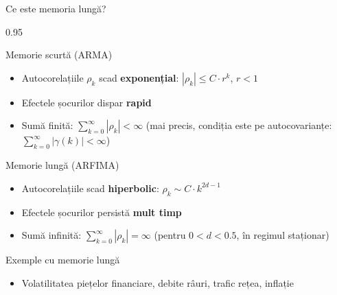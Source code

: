 \documentclass[9pt, aspectratio=169, t]{beamer}
\begin{document}
\begin{frame}{Ce este memoria lungă?}
    \begin{cminipage}{0.95\textwidth}
        \begin{block}{Memorie scurtă (ARMA)}
            \begin{itemize}\setlength{\itemsep}{0pt}
                \item Autocorelațiile $\rho_k$ scad \textbf{exponențial}: $|\rho_k| \leq C \cdot r^k$, $r < 1$
                \item Efectele șocurilor dispar \textbf{rapid}
                \item Sumă finită: $\sum_{k=0}^{\infty} |\rho_k| < \infty$ (mai precis, condiția este pe autocovarianțe: $\sum_{k=0}^{\infty} |\gamma(k)| < \infty$)
            \end{itemize}
        \end{block}

        \vspace{0.1cm}

        \begin{alertblock}{Memorie lungă (ARFIMA)}
            \begin{itemize}\setlength{\itemsep}{0pt}
                \item Autocorelațiile scad \textbf{hiperbolic}: $\rho_k \sim C \cdot k^{2d-1}$
                \item Efectele șocurilor persistă \textbf{mult timp}
                \item Sumă infinită: $\sum_{k=0}^{\infty} |\rho_k| = \infty$ (pentru $0 < d < 0.5$, în regimul staționar)
            \end{itemize}
        \end{alertblock}

        \vspace{0.1cm}

        \begin{exampleblock}{Exemple cu memorie lungă}
            \begin{itemize}\setlength{\itemsep}{0pt}
                \item Volatilitatea piețelor financiare, debite râuri, trafic rețea, inflație
            \end{itemize}
        \end{exampleblock}
    \end{cminipage}
\end{frame}
\end{document}
